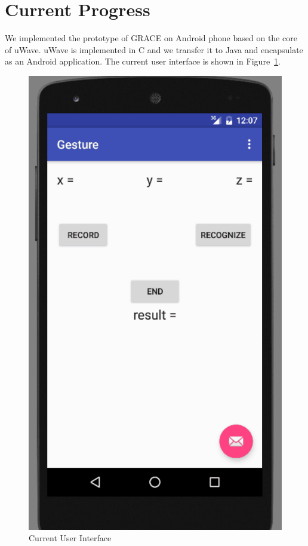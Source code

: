 \documentclass{acm_proc_article-sp}
\begin{document}
\section{Current Progress}
\label{progress}
We implemented the prototype of GRACE on Android phone based on the core of uWave. uWave is implemented in C and we transfer it to Java and encapsulate as an Android application. The current user interface is shown in Figure~\ref{GRACEui}.  
\begin{figure}
  \centering
  \includegraphics[scale = 0.3]{ui.png}
  \caption{Current User Interface}
  \label{GRACEui}
\end{figure} 
\end{document}
